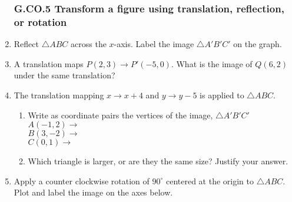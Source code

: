 \documentclass[12pt, twoside]{article}
\begin{document}
\begin{enumerate}[itemsep=0.5cm]
\newpage
\subsubsection*{G.CO.5 Transform a figure using translation, reflection, or rotation}
\item  Reflect $\triangle ABC$ across the $x$-axis. Label the image $\triangle A'B'C'$ on the graph.
    \begin{center}
      \end{center}
  
\item A translation maps $P(2,3) \rightarrow P'(-5,0)$. What is the image of $Q(6,2)$ under the same translation? \vspace{1cm}
      
\item The translation mapping $x \rightarrow x+4$ and $y \rightarrow y - 5$ is applied to $\triangle ABC$.
  \begin{enumerate}
    \item Write as coordinate pairs the vertices of the image, $\triangle A'B'C'$ \\[0.3cm]
    $A(-1,2) \rightarrow$ \\[0.7cm]
    $B(3,-2) \rightarrow$ \\[0.7cm]
    $C(0,1) \rightarrow$ \\[0.1cm]
    \item Which triangle is larger, or are they the same size? Justify your answer.
  \end{enumerate} \vspace{2cm}

\newpage
\item Apply a counter clockwise rotation of $90^\circ$ centered at the origin to $\triangle ABC$. Plot and label the image on the axes below.
  \begin{center}
  \end{center}


\end{enumerate}
\end{document}
